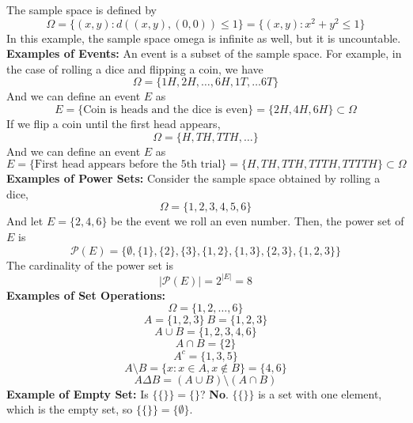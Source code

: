 \documentclass[openany]{report}
\newcommand{\powerset}[0]{\mathcal{P}}
\begin{document}
The sample space is defined by 
\[\Omega = \{(x,y): d((x,y),(0,0)) \leq 1\} = \{(x,y): x^2 + y^2 \leq 1\} \]
In this example, the sample space omega is infinite as well, but it is uncountable.\\[2ex]
\textbf{Examples of Events:} An event is a subset of the sample space. For example, in the case of rolling a dice and flipping a coin, we have 
\[\Omega = \{1H, 2H, \ldots, 6H, 1T, \ldots 6T\}\]
And we can define an event $E$ as 
\[E = \{\text{Coin is heads and the dice is even}\} = \{2H, 4H, 6H\} \subset \Omega\]
If we flip a coin until the first head appears, 
\[\Omega = \{H, TH, TTH, \ldots\}\]
And we can define an event $E$ as
\[E = \{\text{First head appears before the 5th trial}\} = \{H, TH, TTH, TTTH, TTTTH\} \subset \Omega\]
\textbf{Examples of Power Sets:} Consider the sample space obtained by rolling a dice,
\[\Omega = \{1,2,3,4,5,6\}\]
And let $E = \{2,4,6\}$ be the event we roll an even number. Then, the power set of $E$ is 
\[\powerset(E) = \{\emptyset, \{1\}, \{2\}, \{3\}, \{1, 2\}, \{1, 3\}, \{2,3\}, \{1,2,3\}\}\]
The cardinality of the power set is 
\[|\powerset(E)| = 2^{|E|} = 8\]
\noindent
\textbf{Examples of Set Operations:}
\[\Omega = \{1,2,\ldots, 6\}\]
\[A = \{1,2,3\} \ B = \{1,2, 3\}\]
\[A \cup B = \{1,2,3,4,6\}\]
\[A \cap B = \{2\}\]
\[A^c = \{1,3,5\}\]
\[A \setminus B = \{x: x \in A, x \not\in B\} = \{4,6\}\]
\[A \Delta B = (A \cup B) \setminus (A \cap B)\]
\textbf{Example of Empty Set:}
Is $\{\{\}\} = \{\}$? \textbf{No}. $\{\{\}\}$ is a set with one element, which is the empty set, so $\{\{\}\} = \{\emptyset\}$.\\
\end{document}
